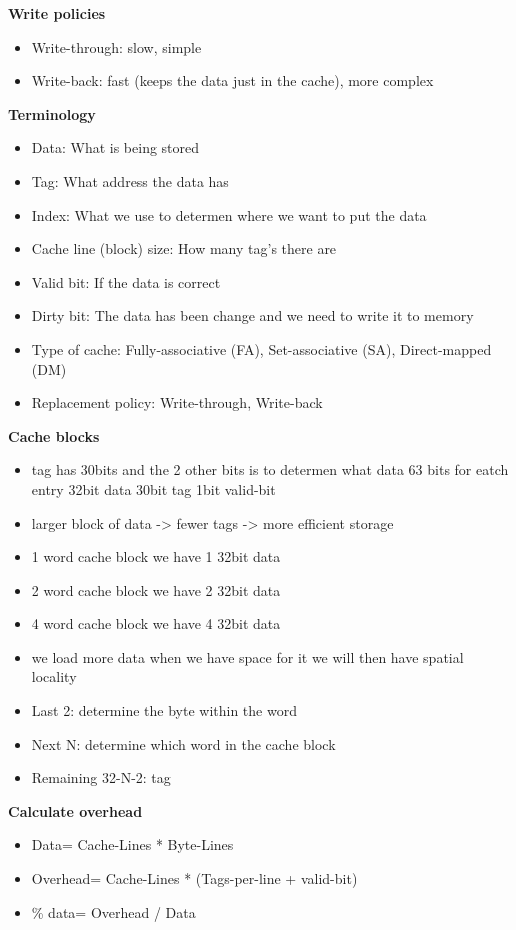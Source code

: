 \textbf{Write policies}
\begin{itemize}
\item  Write-through: slow, simple 
\item  Write-back: fast (keeps the data just in the cache), more complex
\end{itemize}

\textbf{Terminology}
\begin{itemize}
\item  Data: What is being stored
\item  Tag: What address the data has
\item  Index: What we use to determen where we want to put the data
\item  Cache line (block) size: How many tag's there are
\item  Valid bit: If the data is correct
\item  Dirty bit: The data has been change and we need to write it to memory
\item  Type of cache: Fully-associative (FA), Set-associative (SA), Direct-mapped (DM)
\item  Replacement policy: Write-through, Write-back  
\end{itemize}


\textbf{Cache blocks}
\begin{itemize}
\item tag has 30bits and the 2 other bits is to determen what data
  63 bits for eatch entry 32bit data 30bit tag 1bit valid-bit 
\item larger block of data -> fewer tags -> more efficient storage
\item 1 word cache block we have 1 32bit data
\item 2 word cache block we have 2 32bit data 
\item 4 word cache block we have 4 32bit data
\item we load more data when we have space for it
  we will then have spatial locality
\item Last 2: determine the byte within the word   
\item Next N: determine which word in the cache block 
\item Remaining 32-N-2: tag
\end{itemize}

\textbf{Calculate overhead}
\begin{itemize}
\item  Data= Cache-Lines * Byte-Lines
\item  Overhead= Cache-Lines * (Tags-per-line + valid-bit)
\item  \% data=  Overhead / Data
\end{itemize}

